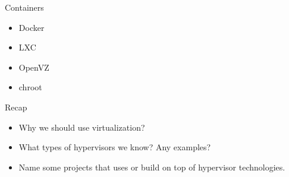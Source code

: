 \documentclass[presentation]{beamer}
\begin{document}
\begin{frame}[label={sec:org83a3ae9}]{Containers}
\begin{itemize}
\item Docker
\item LXC
\item OpenVZ
\item chroot
\end{itemize}
\end{frame}

\begin{frame}[label={sec:org79d80fb}]{Recap}
\begin{itemize}
\item Why we should use virtualization?
\item What types of hypervisors we know? Any examples?
\item Name some projects that uses or build on top of hypervisor technologies.
\end{itemize}
\end{frame}
\end{document}
